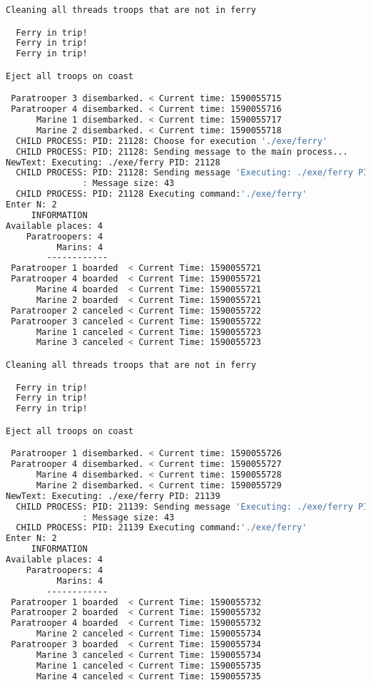 \documentclass{article}
\begin{document}
\begin{lstlisting}[language=BASH]
Cleaning all threads troops that are not in ferry

  Ferry in trip!
  Ferry in trip!
  Ferry in trip!

Eject all troops on coast

 Paratrooper 3 disembarked. < Current time: 1590055715
 Paratrooper 4 disembarked. < Current time: 1590055716
      Marine 1 disembarked. < Current time: 1590055717
      Marine 2 disembarked. < Current time: 1590055718
  CHILD PROCESS: PID: 21128: Choose for execution './exe/ferry'
  CHILD PROCESS: PID: 21128: Sending message to the main process...
NewText: Executing: ./exe/ferry PID: 21128
  CHILD PROCESS: PID: 21128: Sending message 'Executing: ./exe/ferry PID: 21128' to the MAIN process...
               : Message size: 43
  CHILD PROCESS: PID: 21128 Executing command:'./exe/ferry'
Enter N: 2
     INFORMATION
Available places: 4
    Paratroopers: 4
          Marins: 4
        ------------
 Paratrooper 1 boarded  < Current Time: 1590055721 
 Paratrooper 4 boarded  < Current Time: 1590055721 
      Marine 4 boarded  < Current Time: 1590055721 
      Marine 2 boarded  < Current Time: 1590055721 
 Paratrooper 2 canceled < Current Time: 1590055722 
 Paratrooper 3 canceled < Current Time: 1590055722 
      Marine 1 canceled < Current Time: 1590055723 
      Marine 3 canceled < Current Time: 1590055723 

Cleaning all threads troops that are not in ferry

  Ferry in trip!
  Ferry in trip!
  Ferry in trip!

Eject all troops on coast

 Paratrooper 1 disembarked. < Current time: 1590055726
 Paratrooper 4 disembarked. < Current time: 1590055727
      Marine 4 disembarked. < Current time: 1590055728
      Marine 2 disembarked. < Current time: 1590055729
NewText: Executing: ./exe/ferry PID: 21139
  CHILD PROCESS: PID: 21139: Sending message 'Executing: ./exe/ferry PID: 21139' to the MAIN process...
               : Message size: 43
  CHILD PROCESS: PID: 21139 Executing command:'./exe/ferry'
Enter N: 2
     INFORMATION
Available places: 4
    Paratroopers: 4
          Marins: 4
        ------------
 Paratrooper 1 boarded  < Current Time: 1590055732 
 Paratrooper 2 boarded  < Current Time: 1590055732 
 Paratrooper 4 boarded  < Current Time: 1590055732 
      Marine 2 canceled < Current Time: 1590055734 
 Paratrooper 3 boarded  < Current Time: 1590055734 
      Marine 3 canceled < Current Time: 1590055734 
      Marine 1 canceled < Current Time: 1590055735 
      Marine 4 canceled < Current Time: 1590055735 


\end{lstlisting}
\end{document}
